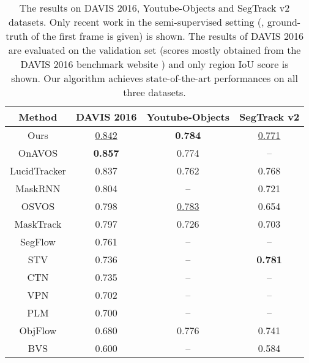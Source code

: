 \documentclass[10pt,twocolumn,letterpaper]{article}
\begin{document}
\begin{table}[t!]\footnotesize
\begin{center}
 \begin{tabular}{cccc}
\hline
Method  & DAVIS 2016   &  Youtube-Objects  &  SegTrack v2\\
\hline
\hline
Ours                                    &  \underline{0.842}    &   \textbf{0.784}   & \underline{0.771} \\
OnAVOS \cite{voigtlaender2017online}    &  \textbf{0.857} &   0.774   &  -- \\
LucidTracker \cite{DAVIS2017-2nd}       &  0.837 &   0.762   & 0.768 \\
MaskRNN \cite{hu2017maskrnn}            &  0.804 &   --      & 0.721 \\
OSVOS \cite{caelles2017one}             &  0.798 &   \underline{0.783}   & 0.654 \\
MaskTrack \cite{perazzi2017learning}    &  0.797 &   0.726   & 0.703 \\
SegFlow \cite{cheng2017segflow}         &  0.761 &   --      & -- \\
STV \cite{wang2017super}                &  0.736 &   --      & \textbf{0.781} \\
CTN \cite{jang2017online}               &  0.735 &   --      & -- \\
VPN \cite{jampani2017cvpr}              &  0.702 &   --      & -- \\
PLM \cite{shin2017pixel}                &  0.700 &   --      & -- \\
ObjFlow \cite{tsai2016video}            &  0.680 &   0.776   & 0.741 \\
BVS \cite{marki2016bilateral}           &  0.600 &   --      & 0.584 \\
\hline
\end{tabular}
\end{center}
\vspace{-5mm}
\caption{The results on DAVIS 2016, Youtube-Objects and SegTrack v2 datasets. Only recent work in the semi-supervised setting (\ie, ground-truth of the first frame is given) is shown.
The results of DAVIS 2016 are evaluated on the validation set (scores mostly obtained from the DAVIS 2016 benchmark website \cite{davisbenchmarkwebsitemanual})
and only region IoU  score is shown. Our algorithm achieves state-of-the-art performances on all three datasets.}
\vspace{-4mm}
\label{table.traditionalbenchmarks}
\end{table}
\end{document}
